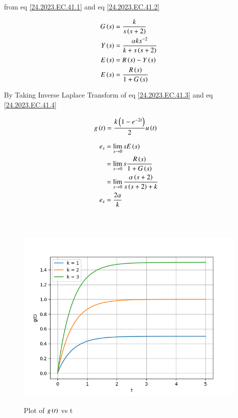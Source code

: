 \documentclass[journal,12pt,twocolumn]{IEEEtran}
\begin{document}
from eq \eqref{24.2023.EC.41.1} and eq \eqref{24.2023.EC.41.2}

\begin{align}
        G\left(s\right) &= \frac{k}{s\left(s +2\right)}  \label{24.2023.EC.41.3} \\ 
        Y\left(s\right) &= \frac{\alpha k s^{-2}}{k + s\left(s+2\right)} \label{24.2023.EC.41.4} \\
        E\left(s\right) &= R\left(s\right) - Y\left(s\right)  \label{24.2023.EC.41.5} \\ 
        E\left(s\right) &= \frac{R\left(s\right)}{1 + G\left(s\right)}
\end{align}

By Taking Inverse Laplace Transform of eq \eqref{24.2023.EC.41.3} and eq \eqref{24.2023.EC.41.4}

\begin{align}
	g\left(t\right) &= \frac{k\left(1 - e^{-2t}\right)}{2} u\left(t\right)
\end{align}

\begin{align}
    e_s &= \displaystyle\lim_{s\to 0}s E\left(s\right) \\
    &= \displaystyle\lim_{s\to 0} s \frac{R\left(s\right)}{1 + G\left(s\right)} \\
    &= \displaystyle\lim_{s\to 0} \frac{\alpha \left(s+2\right)}{s\left(s+2\right) + k} \\
    e_s &= \frac{2\alpha}{k}
\end{align}
\\
\\
\begin{figure}[ht]
\centering
    \includegraphics[width=0.95\linewidth]{figs/gate.png}
    \label{fig: 23.EC.41.24.2}
    \caption{Plot of $g\left(t\right)$ vs t }
\end{figure}
\end{document}
